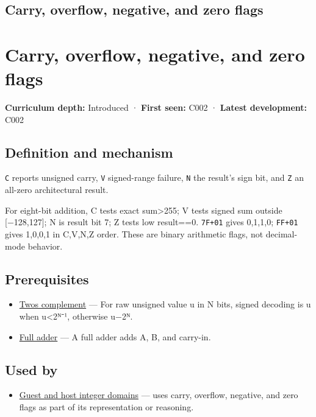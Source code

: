 \hypertarget{appendix-8d687c9c08ab}{}
\section*{Carry, overflow, negative, and zero flags}
\chapter{Carry, overflow, negative, and zero flags}\label{appendix-8d687c9c08ab-carry-overflow-negative-and-zero-flags}

\textbf{Curriculum depth:} Introduced · \textbf{First seen:} C002 · \textbf{Latest development:} C002

\section{Definition and mechanism}\label{appendix-8d687c9c08ab-definition-and-mechanism}

\texttt{C} reports unsigned carry, \texttt{V} signed-range failure, \texttt{N} the result's sign bit, and \texttt{Z} an all-zero architectural result.

For eight-bit addition, C tests exact sum\textgreater255; V tests signed sum outside {[}−128,127{]}; N is result bit 7; Z tests low result==0. \texttt{7F+01} gives 0,1,1,0; \texttt{FF+01} gives 1,0,0,1 in C,V,N,Z order. These are binary arithmetic flags, not decimal-mode behavior.

\section{Prerequisites}\label{appendix-8d687c9c08ab-prerequisites}

\begin{itemize}
\tightlist
\item
  \hyperref[appendix-4fbc03d20829]{Two\textquotesingle s complement} --- For raw unsigned value u in N bits, signed decoding is u when u\textless2ᴺ⁻¹, otherwise u−2ᴺ.
\item
  \hyperref[appendix-d1a5b1e520c2]{Full adder} --- A full adder adds A, B, and carry-in.
\end{itemize}

\section{Used by}\label{appendix-8d687c9c08ab-used-by}

\begin{itemize}
\tightlist
\item
  \hyperref[appendix-33e7a011b684]{Guest and host integer domains} --- uses carry, overflow, negative, and zero flags as part of its representation or reasoning.
\end{itemize}

